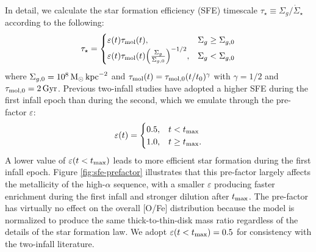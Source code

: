 \documentclass[twocolumn,twocolappendix,linenumbers]{aastex631}
\begin{document}
In detail, we calculate the star formation efficiency (SFE) timescale $\tau_\star\equiv\Sigma_g/\dot\Sigma_\star$ according to the following:
\begin{equation}
    \label{eq:sf-law}
    \tau_\star = 
    \begin{cases}
        \varepsilon(t) \tau_{\rm mol}(t),   & \Sigma_g \ge \Sigma_{g,0} \\
        \varepsilon(t) \tau_{\rm mol}(t) \Big(\frac{\Sigma_g}{\Sigma_{g,0}}\Big)^{-1/2}, & \Sigma_g < \Sigma_{g,0}
    \end{cases}
\end{equation}
where $\Sigma_{g,0} = 10^8\,{\rm M}_\odot\,{\rm kpc}^{-2}$ and $\tau_{\rm mol}(t)=\tau_{\rm mol,0}(t/t_0)^\gamma$ with $\gamma=1/2$ and $\tau_{\rm mol,0}=2\,{\rm Gyr}$. Previous two-infall studies \citep[e.g.,][]{nissen_high-precision_2020} have adopted a higher SFE during the first infall epoch than during the second, which we emulate through the pre-factor $\varepsilon$:
\begin{equation}
    \label{eq:sfe-prefactor}
    \varepsilon(t) = 
    \begin{cases}
        0.5, & t < t_{\rm max} \\
        1.0, & t \ge t_{\rm max}.
    \end{cases}
\end{equation}
A lower value of $\varepsilon(t<t_{\rm max})$ leads to more efficient star formation during the first infall epoch. Figure \ref{fig:sfe-prefactor} illustrates that this pre-factor largely affects the metallicity of the high-$\alpha$ sequence, with a smaller $\varepsilon$ producing faster enrichment during the first infall and stronger dilution after $t_{\rm max}$. The pre-factor has virtually no effect on the overall [O/Fe] distribution because the model is normalized to produce the same thick-to-thin-disk mass ratio regardless of the details of the star formation law. We adopt $\varepsilon(t<t_{\rm max})=0.5$ for consistency with the two-infall literature.
\end{document}
